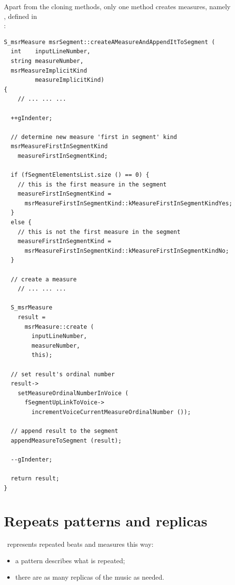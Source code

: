 Apart from the cloning methods, only one method creates measures, namely\\
, defined in\\
:
\begin{lstlisting}[language=CPlusPlus]
S_msrMeasure msrSegment::createAMeasureAndAppendItToSegment (
  int    inputLineNumber,
  string measureNumber,
  msrMeasureImplicitKind
         measureImplicitKind)
{
	// ... ... ...

  ++gIndenter;

  // determine new measure 'first in segment' kind
  msrMeasureFirstInSegmentKind
    measureFirstInSegmentKind;

  if (fSegmentElementsList.size () == 0) {
    // this is the first measure in the segment
    measureFirstInSegmentKind =
      msrMeasureFirstInSegmentKind::kMeasureFirstInSegmentKindYes;
  }
  else {
    // this is not the first measure in the segment
    measureFirstInSegmentKind =
      msrMeasureFirstInSegmentKind::kMeasureFirstInSegmentKindNo;
  }

  // create a measure
	// ... ... ...

  S_msrMeasure
    result =
      msrMeasure::create (
        inputLineNumber,
        measureNumber,
        this);

  // set result's ordinal number
  result->
    setMeasureOrdinalNumberInVoice (
      fSegmentUpLinkToVoice->
        incrementVoiceCurrentMeasureOrdinalNumber ());

  // append result to the segment
  appendMeasureToSegment (result);

  --gIndenter;

  return result;
}
\end{lstlisting}


\section{Repeats patterns and replicas}\label{Repeats patterns and replicas}

\msrRepr\ represents repeated beats and measures this way:
\begin{itemize}
\item a pattern describes what is repeated;
\item there are as many replicas of the music as needed.
\end{itemize}

